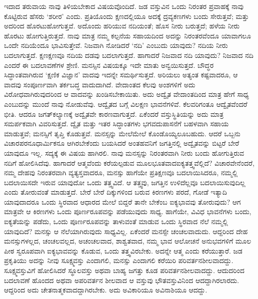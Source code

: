 ಇದಾದ ತರುವಾಯ ನಾವು ತಿಳಿಯಬೇಕಾದ ವಿಷಯವೊಂದಿದೆ. ಜಡ ವಸ್ತುವಿನ ಒಂದು ನಿರಂತರ ಪ್ರವಾಹಕ್ಕೆ ನಾವು ಕೊಟ್ಟಿರುವ ಹೆಸರು ‘ಶರೀರ’ ಎಂದು. ಪ್ರತಿಯೊಂದು ಕ್ಷಣದಲ್ಲಿಯೂ ಅದಕ್ಕೆ ದ್ರವ್ಯಕಣಗಳು ಬಂದು ಸೇರುತ್ತವೆ; ಮತ್ತು ಅದರಿಂದ ಹೊರಟುಹೋಗುತ್ತವೆ. ಅದೊಂದು ಹರಿಯುವ ನದಿಯಂತೆ; ಹೊಸ ನೀರು ಬರುತ್ತದೆ; ಹಳೆಯ ನೀರು ಹೊರಟು ಹೋಗುತ್ತಿರುತ್ತದೆ. ನಾವು ಮಾತ್ರ ನಮ್ಮ ಕಲ್ಪನೆಯ ಸಹಾಯದಿಂದ ಅದನ್ನು ನಿರಂತರವೆಂದೂ ಯಾವಾಗಲೂ ಒಂದೇ ನದಿಯೆಂದೂ ಭಾವಿಸುತ್ತೇವೆ. ನಿಜವಾಗಿ ನೋಡಿದರೆ ‘ನದಿ’ ಎಂಬುದು ಯಾವುದು? ನದಿಯ ನೀರು ಬದಲಾಗುತ್ತದೆ. ಕ್ಷಣಕ್ಷಣವೂ ನದಿಯ ದಡವು ಬದಲಾಗುತ್ತದೆ. ಹಾಗಾದರೆ ನಿಜವಾದ ನದಿ ಯಾವುದು? ನಿಜವಾದ ನದಿ ಎಂದರೆ ಈ ಬದಲಾವಣೆಗಳ ಶ್ರೇಣಿ. ಮನಸ್ಸಿನ ವಿಷಯಕ್ಕೂ ಇದೇ ಮಾತು ಅನ್ವಯಿಸುತ್ತದೆ. ಬೌದ್ಧರ ಸಿದ್ಧಾಂತವಾಗಿರುವ ‘ಕ್ಷಣಿಕ ವಿಜ್ಞಾನ’ ವಾದವು ಇದನ್ನೇ ಸಮರ್ಥಿಸುತ್ತದೆ. ಅರಿಯಲು ಅತ್ಯಂತ ಕಷ್ಟವಾದರೂ, ಆ ವಾದವು ಸಂಪೂರ್ಣವಾಗಿ ತರ್ಕಬದ್ಧ ವಾದುದಾಗಿದೆ. ವೇದಾಂತದ ಕೆಲವು ಅಂಶಗಳಿಗೆ ಅದು ವಿರೋಧವಾಗಿರುವುದರಿಂದ ಆ ವಾದವನ್ನು ಖಂಡಿಸಬೇಕಾಯಿತು. ಅದು ಅದ್ವೈತ ವೇದಾಂತದಿಂದ ಮಾತ್ರ ಹೇಗೆ ಸಾಧ್ಯ ಎಂಬುದನ್ನು ಮುಂದೆ ನಾವು ನೋಡುವೆವು. ಆದ್ವೈತದ ಬಗ್ಗೆ ವಿಲಕ್ಷಣ ಭಾವನೆಗಳಿವೆ. ಕೆಲವರಿಗಂತೂ ಆದ್ವೈತವೆಂದರೆ ಭೀತಿ. ಆದರೂ ಜಗತ್​ ಕಲ್ಯಾಣಕ್ಕೆ ಅದ್ವೈತವೇ ಕಾರಣವಾಗುತ್ತದೆ. ಏಕೆಂದರೆ ವಸ್ತುಸ್ಥಿತಿಯನ್ನು ಅದು ಮಾತ್ರ ಸಮರ್ಪಕವಾಗಿ ವಿವರಿಸುತ್ತದೆ. ದ್ವೈತ ಮತ್ತು ಇತರ ಸಿದ್ಧಾಂತಗಳು ಭಗವದುಪಾಸನೆಗೆ ಬಹಳವಾಗಿ ಸಹಾಯ ಮಾಡುತ್ತವೆ; ಮನಸ್ಸಿಗೆ ತೃಪ್ತಿ ಕೊಡುತ್ತವೆ. ಮನಸ್ಸನ್ನು ಮೇಲೆ\break ಮೇಲೆ ಕೊಂಡೊಯ್ಯಲೂಬಹುದು. ಆದರೆ ಒಬ್ಬನು ವಿಚಾರಪರನೂ\break ಧಾರ್ಮಿಕನೂ ಆಗಿರಬೇಕೆಂದು ಬಯಸಿದರೆ ಅಂತಹವನಿಗೆ ಜಗತ್ತಿನಲ್ಲಿ ಅದ್ವೈತವನ್ನು ಬಿಟ್ಟರೆ ಬೇರೆ ಯಾವುದೂ ಇಲ್ಲ. ಸದ್ಯಕ್ಕೆ ಈ ವಿಷಯ ಹಾಗಿರಲಿ. ನಾವು ಮನಸ್ಸನ್ನು ನಿರಂತರವಾಗಿ ನೀರು ಬಂದು ಹೋಗುತ್ತಿರುವ ನದಿಗೆ ಹೋಲಿಸಿದೆವು. ಹಾಗಾದರೆ ಆತ್ಮವೆಂದು ಕರೆಯಲ್ಪಡುವ ಮೂಲಭೂತವಾದ\break ಐಕ್ಯತತ್ತ್ವವೆಲ್ಲಿದೆ? ವಿಚಾರವೇನೆಂದರೆ, ನಮ್ಮ ದೇಹವು ನಿರಂತರವಾಗಿ ವ್ಯತ್ಯಸ್ತವಾದರೂ, ಮನಸ್ಸು ಹಾಗೆಯೇ ಪ್ರತಿಕ್ಷಣವೂ ಬದಲಾಯಿಸಿದರೂ, ನಮ್ಮಲ್ಲಿ ಬದಲಾಯಿಸದೇ ಇರುವ ಯಾವುದೋ ಒಂದು ತತ್ತ್ವವಿದೆ. ಆ ತತ್ತ್ವವು, ಜಗತ್ತಿನ ಉಳಿದೆಲ್ಲವೂ ಬದಲಾಯಿಸುವುದಿಲ್ಲ ಎಂದು ತೋರುವಂತೆ ಮಾಡುತ್ತದೆ. ಬೇರೆ ಬೇರೆ ದಿಕ್ಕುಗಳಿಂದ ಬರುವ ಕಿರಣಗಳು ಪರದೆ, ಗೋಡೆ ಇತ್ಯಾದಿ ಯಾವುದಾದರೂ ಒಂದು ಸ್ಥಿರವಾದ ಆಧಾರದ ಮೇಲೆ ಬಿದ್ದರೆ ತಾನೇ ಬೇಕೆಂಬ ಐಕ್ಯಭಾವವು ತೋರುವುದು? ಆಗ ಮಾತ್ರವೇ ಆ ಕಿರಣಗಳು ಒಂದು ಪೂರ್ಣರೂಪವನ್ನು ಪಡೆಯುವುದು ಸಾಧ್ಯ. ಹಾಗೆಯೇ, ವಿವಿಧ ಭಾವನೆಗಳು ಬಂದು, ಐಕ್ಯತೆಯನ್ನು ಪಡೆದು, ಒಂದು ಪೂರ್ಣರೂಪವನ್ನು ತಾಳುವಂತೆ ಮಾಡುವ ಒಂದು ಸ್ಥಿರವಾದ ನೆಲೆ ನಮ್ಮಲ್ಲಿ ಯಾವುದಿದೆ? ಮನಸ್ಸು ಆ ನೆಲೆಯಾಗಿರುವುದು ಸಾಧ್ಯವಿಲ್ಲ. ಏಕೆಂದರೆ ಮನಸ್ಸೇ ಚಂಚಲವಾದುದು. ಆದ್ದರಿಂದ ದೇಹ ಮನಸ್ಸುಗಳಲ್ಲದ, ಚಂಚಲವಲ್ಲದ, ಅಚಂಚಲವಾದ, ಶಾಶ್ವತವಾದ, ನಮ್ಮ ಭಾವ ಆಲೋಚನೆ ಅನುಭವಗಳಿಗೆ ಮೂಲ ಪೀಠ ಸ್ವರೂಪವಾಗಿ ಐಕ್ಯಭಾವವನ್ನು ಕೊಡುವ, ಒಂದು ತತ್ತ್ವವಿರಬೇಕು. ಅದನ್ನೇ ಆತ್ಮ ಎಂದು ಕರೆಯುತ್ತಾರೆ. ಜಡ ಪ್ರಕೃತಿಯು ಅದನ್ನು ನೀವು ಸೂಕ್ಷ್ಮವಸ್ತು ಎಂದಾಗಲಿ, ಮನಸ್ಸು ಎಂದಾಗಲಿ ಕರೆಯಿರಿ ಪರಿವರ್ತನಶೀಲವಾದದ್ದು. ಸೂಕ್ಷ್ಮವಸ್ತುವಿಗೆ ಹೋಲಿಸಿದರೆ ಸ್ಥೂಲವಸ್ತು ಅಥವಾ ಬಾಹ್ಯ ಜಗತ್ತು ಕೂಡ ಪರಿವರ್ತನಶೀಲವಾದದ್ದು. ಆದುದರಿಂದ ಬದಲಾವಣೆ ಹೊಂದದ ಅಥವಾ ಅಪರಿವರ್ತನ ಶೀಲವಾದ ಆ ವಸ್ತುವು ಭೌತವಸ್ತುವಿನಿಂದ ಆದದ್ದಾಗಿರಲಾರದು. ಆದ್ದರಿಂದ ಅದು ಚೇತನಾತ್ಮಕವಾದ\-ದ್ದಾಗಿರಬೇಕು. ಅದು ಅವಿಕಾರಿಯೂ ಅವಿನಾಶಿಯೂ ಆದದ್ದು.

